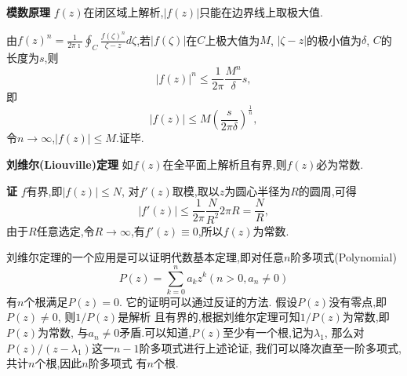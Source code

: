 \textbf{模数原理} $f(z)$在闭区域上解析,$|f(z)|$只能在边界线上取极大值.

由$f(z)^n = \frac{1}{2\pi \imath} \oint_C \frac{f(\zeta)^n}{\zeta - z} d \zeta$,若$|f(\zeta)|$在$C$上极大值为$M$,
$|\zeta - z|$的极小值为$\delta$, $C$的长度为$s$,则
\[
  |f(z)|^n \leq \frac{1}{2\pi} \frac{M^n}{\delta} s  ,
\]
即
\[
    |f(z)| \leq M \left( \frac{s}{2\pi \delta} \right)^{\frac{1}{n}},
\]
令$n\to \infty$,$|f(z)| \leq M$.证毕.

\textbf{刘维尔(Liouville)定理} \quad 如$f(z)$在全平面上解析且有界,则$f(z)$必为常数.

\textbf{证} \quad $f$有界,即$|f(z)| \leq N$, 对$f'(z)$取模,取以$z$为圆心半径为$R$的圆周,可得
\[
  |f'(z)| \leq \frac{1}{2\pi} \frac{N} {R^2} 2\pi R = \frac{N}{R},
\]
由于$R$任意选定,令$R\to \infty$,有$f'(z) \equiv 0$,所以$f(z)$为常数.

刘维尔定理的一个应用是可以证明代数基本定理,即对任意$n$阶多项式(Polynomial)
\begin{equation}
    P(z) = \sum_{k=0}^{n} a_k z^k (n>0, a_n \neq 0)
    \label{eq:poly}
\end{equation}
有$n$个根满足$P(z) = 0$. 它的证明可以通过反证的方法. 
假设$P(z)$没有零点,即$P(z)\neq 0$, 则$1/P(z)$是解析
且有界的,根据刘维尔定理可知$1/P(z)$为常数,即$P(z)$为常数,
与$a_n\neq 0$矛盾.可以知道,$P(z)$至少有一个根,记为$\lambda_1$,
那么对$P(z)/(z-\lambda_1)$这一$n-1$阶多项式进行上述论证,
我们可以降次直至一阶多项式,共计$n$个根,因此$n$阶多项式
有$n$个根.


